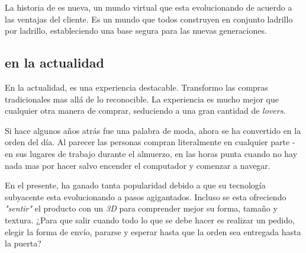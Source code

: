 %
%
%

La historia de \ecommerce es nueva, un mundo virtual que esta evolucionando de acuerdo a las ventajas del cliente. Es un mundo que todos construyen en conjunto ladrillo por ladrillo, estableciendo una base segura para las nuevas generaciones.

\subsection{\ecommerce en la actualidad}

En la actualidad, \ecommerce es una experiencia destacable. Transformo las compras tradicionales mas allá de lo reconocible. La experiencia es mucho mejor que cualquier otra manera de comprar, seduciendo a una gran cantidad de \ecommerce \textit{lovers}.

Si hace algunos años atrás \ecommerce fue una palabra de moda, ahora se ha convertido en la orden del día. Al parecer las personas compran literalmente en cualquier parte - en sus lugares de trabajo durante el almuerzo, en las horas punta cuando no hay nada mas por hacer salvo encender el computador y comenzar a navegar.

En el presente, \ecommerce ha ganado tanta popularidad debido a que su tecnología subyacente esta evolucionando a pasos agigantados. Incluso se esta ofreciendo \textit{"sentir"} el producto con un \mouse \textit{3D} para comprender mejor su forma, tamaño y textura. ¿Para que salir cuando todo lo que se debe hacer es realizar un pedido, elegir la forma de envío, pararse y esperar hasta que la orden sea entregada hasta la puerta?

